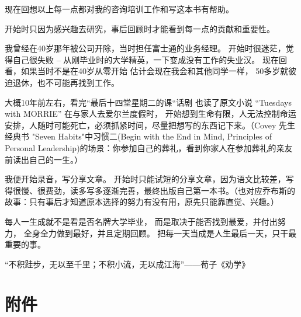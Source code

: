{\begin{minipage}[t]{0.97\columnwidth}
现在回想以上每一点都对我的咨询培训工作和写这本书有帮助。

开始时只因为感兴趣去研究，事后回顾时才能看到每一点的贡献和重要性。

\begin{description}
\item[]
\begin{description}
\tightlist
\item[]
= = =
\end{description}
\end{description}

我曾经在40岁那年被公司开除，当时担任富士通的业务经理。
开始时很迷茫，觉得自己很失败 --
从刚毕业时的大学精英，一下变成没有工作的失业汉。
现在回看，如果当时不是在40岁从零开始 估计会现在我会和其他同学一样，
50多岁就彼迫退休，也不可能再找到工作。\\

\begin{description}
\item[]
\begin{description}
\tightlist
\item[]
= = =
\end{description}
\end{description}

大概10年前左右，看完``最后十四堂星期二的课``话剧 也读了原文小说
``Tuesdays with MORRIE'' 在与家人去爱尔兰度假时，
开始想到生命有限，人无法控制命运安排，人随时可能死亡，必须抓紧时间，尽量把想写的东西记下来。（Covey 先生经典书 "Seven Habits"中习惯二(Begin with the End in Mind,
Principles of Personal
Leadership)的场景：你参加自己的葬礼，看到你家人在参加葬礼的亲友前读出自己的一生。）

我便开始录音，写分享文章。 开始时只能试短的分享文章，因为语文比较差，写得很慢、很费劲，读多写多逐渐完善，最终出版自己第一本书。（也对应乔布斯的故事：只有事后才知道原本选择的努力有没有用，原先只能靠直觉、兴趣。）

每人一生成就不是看是否名牌大学毕业，
而是取决于能否找到最爱，并付出努力， 全身全力做到最好，并且定期回顾。
把每一天当成是人生最后一天，只干最重要的事。

“不积跬步，无以至千里；不积小流，无以成江海”——荀子《劝学》
\strut
\end{minipage}}

\hypertarget{ux9644ux4ef6}{%
\section{附件}\label{ux9644ux4ef6}}

